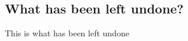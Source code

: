 \subsection{What has been left undone?}
\label{what-has-been-left-undone}
This is what has been left undone